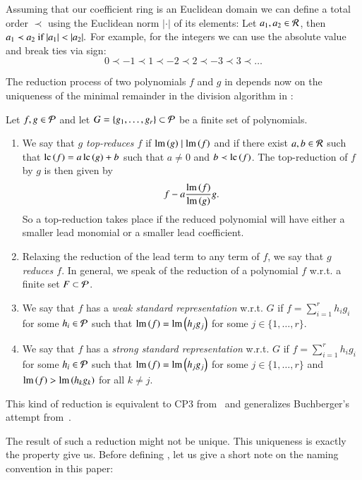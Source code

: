 Assuming that our coefficient ring \er is an Euclidean domain we can define a total
order $\prec$ using the Euclidean norm $|\cdot|$ of its elements: Let $a_1, a_2
\in \mathcal{R}$, then $a_1 \prec a_2 \text{ if } |a_1 | < | a_2 |.$
For example, for the integers we can use the absolute value and break ties via
sign:
\[0\prec -1 \prec 1 \prec -2 \prec 2 \prec -3 \prec 3 \prec \ldots \]

The reduction process of two polynomials $f$ and $g$ in \epr depends now on the
uniqueness of the minimal remainder in the division algorithm in \er:

\begin{definition}
\label{def:reduction}
Let $f, g \in \mathcal{P}$ and let $G= \{g_1,\ldots,g_r\} \subset \mathcal{P}$ be a finite set of
polynomials.
\begin{enumerate}
\item We say that \emph{$g$ top-reduces $f$} if $\operatorname{lm}\left({g}\right) \mid \operatorname{lm}\left({f}\right)$ and if there exist
$a,b \in \mathcal{R}$ such that $\mathrm{lc}\left({f}\right) = a\, \mathrm{lc}\left({g}\right) +b$ such
that $a \neq 0$ and $b \prec \mathrm{lc}\left({f}\right)$. The top-reduction of $f$
by $g$ is then given by
\[f - a \frac{\operatorname{lm}\left({f}\right)}{\operatorname{lm}\left({g}\right)} g.\]
So a top-reduction takes place if the reduced polynomial will have either a smaller lead
monomial or a smaller lead coefficient.
\item Relaxing the reduction of the lead term to any term of $f$, we say
that \emph{$g$ reduces $f$}. In general, we speak of the reduction of a
polynomial $f$ w.r.t. a finite set $F\subset \mathcal{P}$.
\item We say that $f$ has a \emph{weak standard representation} w.r.t. $G$ if
$f = \sum_{i=1}^r h_i g_i$ for some $h_i \in \mathcal{P}$ such that $\operatorname{lm}\left({f}\right) = \operatorname{lm}\left({h_j
  g_j}\right)$ for some $j \in \{1,\ldots,r\}$.
\item We say that $f$ has a \emph{strong standard representation} w.r.t. $G$ if
$f = \sum_{i=1}^r h_i g_i$ for some $h_i \in \mathcal{P}$ such that $\operatorname{lm}\left({f}\right) = \operatorname{lm}\left({h_j
  g_j}\right)$ for some $j \in \{1,\ldots,r\}$ and $\operatorname{lm}\left({f}\right) > \operatorname{lm}\left({h_k g_k}\right)$ for all $k
  \neq j$.
\end{enumerate}
\end{definition}

This kind of reduction is equivalent to CP3 from~\cite{kapur-cp3} and generalizes
Buchberger's attempt from~\cite{buchberger2ndCriterion1985}.

The result of such a reduction might not be unique. This uniqueness is exactly
the property \emph{\stbs} give us. Before defining \stbs, let us give a short note on
the naming convention in this paper:

